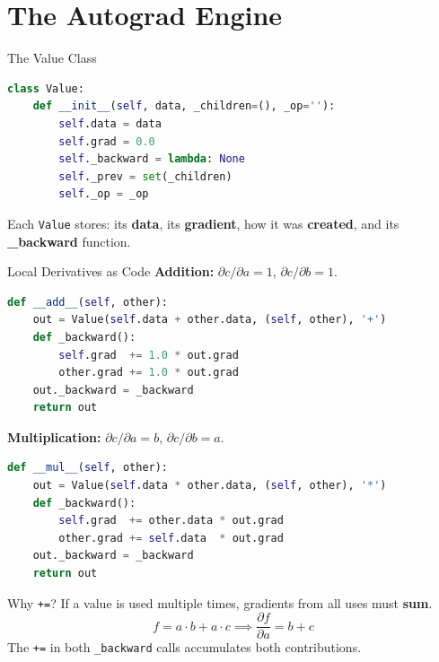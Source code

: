 \documentclass[10pt]{beamer}
\begin{document}
\section{The Autograd Engine}

\begin{frame}{The Value Class}
    \begin{lstlisting}[language=Python, caption={The Value class skeleton}]
class Value:
    def __init__(self, data, _children=(), _op=''):
        self.data = data
        self.grad = 0.0
        self._backward = lambda: None
        self._prev = set(_children)
        self._op = _op
    \end{lstlisting}
    Each \texttt{Value} stores: its \textbf{data}, its \textbf{gradient}, how it was \textbf{created}, and its \textbf{\_backward} function.
\end{frame}

\begin{frame}{Local Derivatives as Code}
    \textbf{Addition:} $\partial c/\partial a = 1$, $\partial c/\partial b = 1$.
    \begin{lstlisting}[language=Python]
def __add__(self, other):
    out = Value(self.data + other.data, (self, other), '+')
    def _backward():
        self.grad  += 1.0 * out.grad
        other.grad += 1.0 * out.grad
    out._backward = _backward
    return out
    \end{lstlisting}
    \textbf{Multiplication:} $\partial c/\partial a = b$, $\partial c/\partial b = a$.
    \begin{lstlisting}[language=Python]
def __mul__(self, other):
    out = Value(self.data * other.data, (self, other), '*')
    def _backward():
        self.grad  += other.data * out.grad
        other.grad += self.data  * out.grad
    out._backward = _backward
    return out
    \end{lstlisting}
\end{frame}

\begin{frame}{Why \texttt{+=}?}
    If a value is used multiple times, gradients from all uses must \textbf{sum}.
    \[
        f = a \cdot b + a \cdot c \implies \frac{\partial f}{\partial a} = b + c
    \]
    The \texttt{+=} in both \texttt{\_backward} calls accumulates both contributions.
\end{frame}
\end{document}
